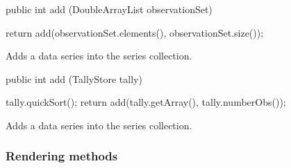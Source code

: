 \begin{code}

   public int add (DoubleArrayList observationSet) \begin{hide} {
      return add(observationSet.elements(), observationSet.size());
   }\end{hide}
\end{code}
\begin{tabb}
   Adds a data series into the series collection.
\end{tabb}
\begin{htmlonly}
\end{htmlonly}
\begin{code}

   public int add (TallyStore tally) \begin{hide} {
      tally.quickSort();
      return add(tally.getArray(), tally.numberObs());
   }\end{hide}
\end{code}
\begin{tabb}
   Adds a data series into the series collection.
\end{tabb}
\begin{htmlonly}
\end{htmlonly}

\subsubsection*{Rendering methods}

